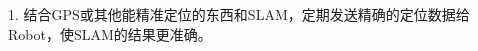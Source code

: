 \documentclass{ctexart}
\begin{document}
1. 结合GPS或其他能精准定位的东西和SLAM，定期发送精确的定位数据给Robot，使SLAM的结果更准确。 
\end{document}
